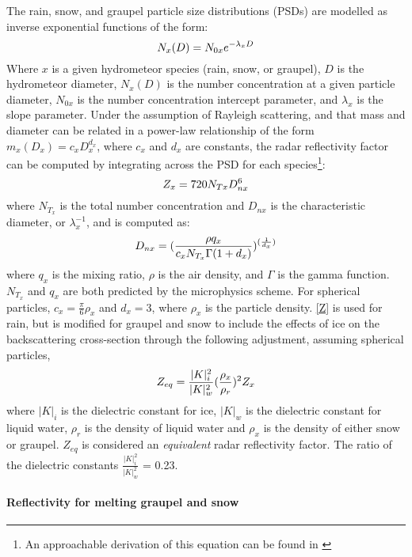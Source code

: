 The rain, snow, and graupel particle size distributions (PSDs) are modelled as inverse exponential functions of the form:
\begin{equation}
\label{psd}
\centering
N_x(D) = N_{0x}e^{-\lambda_xD}
\end{equation}
Where \(x\) is a given hydrometeor species (rain, snow, or graupel), \(D\) is the hydrometeor diameter, \(N_x(D)\) is the number concentration at a given particle diameter, \(N_{0x}\) is the number concentration intercept parameter, and \(\lambda_x\) is the slope parameter. Under the assumption of Rayleigh scattering, and that mass and diameter can be related in a power-law relationship of the form \(m_x(D_x) = c_xD_x^{d_x}\), where \(c_x\) and \(d_x\) are constants, the radar reflectivity factor can be computed by integrating across the PSD for each species\footnote{An approachable derivation of this equation can be found in \citet{milbrandtyau05}}:
\begin{equation}
\centering
\label{Z}
Z_x = 720N_{Tx}D_{nx}^6
\end{equation}
where \(N_{T_x}\) is the total number concentration and \(D_{nx}\) is the characteristic diameter, or \(\lambda^{-1}_x\), and is computed as:
\begin{equation}
\centering
D_{nx} = (\frac{\rho q_x}{c_xN_{T_x}\Gamma(1+d_x)})^{(\frac{1}{d_x})}
\end{equation}
where \(q_x\) is the mixing ratio, \(\rho\) is the air density, and \(\Gamma\) is the gamma function. \(N_{T_x}\) and \(q_x\) are both predicted by the microphysics scheme. For spherical particles, \(c_x = \frac{\pi}{6}\rho_x\) and \(d_x = 3\), where \(\rho_x\) is the particle density. \ref{Z} is used for rain, but is modified for graupel and snow to include the effects of ice on the backscattering cross-section through the following adjustment, assuming spherical particles,
\begin{equation}
\centering
Z_{eq} = \frac{|K|_i^2}{|K|_w^2}(\frac{\rho_x}{\rho_r})^2Z_x
\end{equation}
where \(|K|_i\) is the dielectric constant for ice, \(|K|_w\) is the dielectric constant for liquid water, \(\rho_r\) is the density of liquid water and \(\rho_x\) is the density of either snow or graupel. \(Z_{eq}\) is considered an {\it equivalent} radar reflectivity factor. The ratio of the dielectric constants \(\frac{|K|_i^2}{|K|_w^2}\) = 0.23.

\paragraph{Reflectivity for melting graupel and snow}

